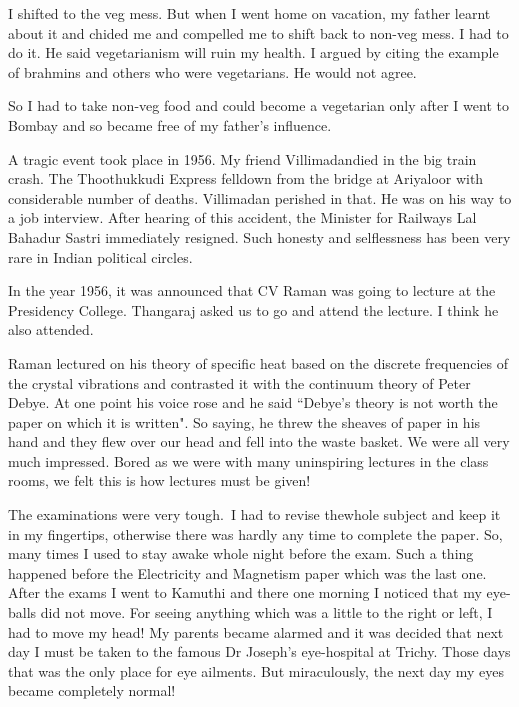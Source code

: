 \vskip 1pt
I shifted to the veg mess. But when I went home on vacation, my father 
learnt about it and chided me and compelled me to shift back to non-veg 
mess. I had to do it. He said vegetarianism will ruin my health. I 
argued by citing the example of brahmins and others who were 
vegetarians. He would not agree.


So I had to take non-veg food and could become a vegetarian only after I 
went to Bombay and so became free of my father's influence.

 
A tragic event took place in 1956. My friend Villimadan\break died in the big 
train crash. The Thoothukkudi Express fell\break down from the bridge at 
Ariyaloor with considerable number of deaths. Villimadan perished in 
that. He was on his way to a job interview. After hearing of this 
accident, the Minister for Railways Lal Bahadur Sastri immediately 
resigned. Such honesty and selflessness has been very rare in Indian 
political circles.


In the year 1956, it was announced that CV Raman was going to lecture at 
the Presidency College. Thangaraj asked us to go and attend the lecture. 
I think he also attended.


Raman lectured on his theory of specific heat based on the discrete 
frequencies of the crystal vibrations and contrasted it with the 
continuum theory of Peter Debye. At one point his voice rose and he said 
``Debye's theory is not worth the paper on which it is written". So 
saying, he threw the sheaves of paper in his hand and they flew over our 
head and fell into the waste basket. We were all very much impressed. 
Bored as we were with many uninspiring lectures in the class rooms, we 
felt this is how lectures must be given!

\vskip 1pt
The examinations were very tough.\ I had to revise the\break whole subject and 
keep it in my fingertips, otherwise there was hardly any time to 
complete the paper. So, many times I used to stay awake whole night 
before the exam. Such a thing happened before the Electricity and 
Magnetism paper which was the last one. After the exams I went to 
Kamuthi and there one morning I noticed that my eye-balls did not move. 
For seeing anything which was a little to the right or left, I had to 
move my head! My parents became alarmed and it was decided that next day 
I must be taken to the famous Dr Joseph's eye-hospital at Trichy. Those 
days that was the only place for eye ailments. But miraculously, the 
next day my eyes became completely normal!

